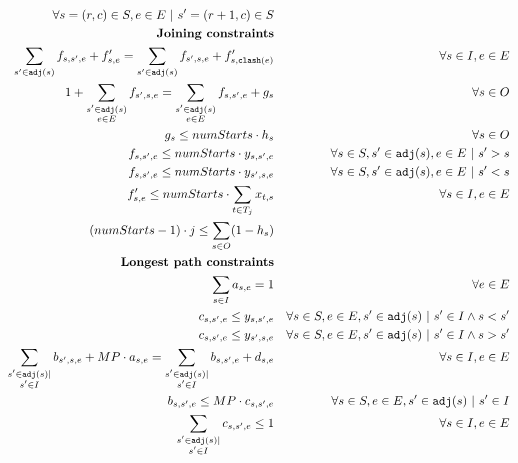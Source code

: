 \documentclass[11pt,a4paper]{article}
\begin{document}
\begin{align}
\forall s = (r,c) \in S, e \in E ~|~  s' = (r+1,c) \in S \\
\textbf{Joining constraints} \notag \\
\label{internal_flows}
\sum_{s' \in \texttt{adj}(s)}f_{s,s',e} + f'_{s,e} = 
\sum_{s' \in \texttt{adj}(s)}f_{s',s,e} + f'_{s,\texttt{clash}(e)} &&
\forall s \in I, e \in E \\
\label{external_flows}
1 + \sum_{\substack{s' \in \texttt{adj}(s) \\ e \in E}}f_{s',s,e} = 
\sum_{\substack{s' \in \texttt{adj}(s) \\  e \in E}}f_{s,s',e} + g_s &&
\forall s \in O \\
\label{sink_connections}
g_s \leq numStarts \cdot h_s &&
\forall s \in O \\
\label{flow_existence_1}
f_{s,s',e} \leq numStarts \cdot y_{s,s',e} &&
\forall s \in S, s' \in \texttt{adj}(s), e \in E ~|~ s' > s \\
\label{flow_existence_2}
f_{s,s',e} \leq numStarts \cdot y_{s',s,e} &&
\forall s \in S, s' \in \texttt{adj}(s), e \in E ~|~ s' < s \\
\label{transfer_flow}
f'_{s,e} \leq numStarts \cdot \sum_{ t \in T_j}x_{t,s} &&
\forall s \in I, e \in E \\
\label{bonus_point}
(numStarts - 1) \cdot j \leq \sum_{s \in O}(1 - h_s) \\
\textbf{Longest path constraints} \notag \\
\label{one_start}
\sum_{s \in I} a_{s,e} = 1 &&
\forall e \in E \\
\label{path_flow_existence_1}
c_{s,s',e} \leq y_{s,s',e} &&
\forall s \in S, e \in E, s' \in \texttt{adj}(s) ~|~ s' \in I \wedge s < s' \\
\label{path_flow_existence_2}
c_{s,s',e} \leq y_{s',s,e} &&
\forall s \in S, e \in E, s' \in \texttt{adj}(s) ~|~ s' \in I \wedge s > s' \\
\label{path_flow}
\sum_{\substack{s' \in \texttt{adj}(s) | \\ s' \in I}}b_{s',s,e} + MP \cdot a_{s,e} =
\sum_{\substack{s' \in \texttt{adj}(s) | \\ s' \in I}}b_{s,s',e} + d_{s,e} &&
\forall s \in I, e \in E \\
\label{no_branching}
b_{s,s',e} \leq MP \cdot c_{s,s',e} &&
\forall s \in S, e \in E, s' \in \texttt{adj}(s) ~|~ s' \in I \\
\label{one_outflow_per_square}
\sum_{\substack{s' \in \texttt{adj}(s) | \\ s' \in I}}c_{s,s',e} \leq 1 &&
\forall s \in I, e \in E
\end{align}
\end{document}
